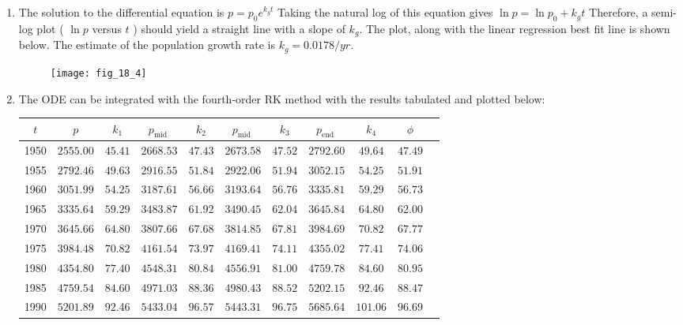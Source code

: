 \documentclass[../main.tex]{subfiles}
\begin{document}
\section{}
\begin{enumerate}[label=\bfseries(\alph*)]
\item The solution to the differential equation is
	\bigbreak
$p=p_{0} e^{k_{g} t}$
	\bigbreak
Taking the natural log of this equation gives
	\bigbreak
$\ln p=\ln p_{0}+k_{g} t$
	\bigbreak
Therefore, a semi-log plot ( $\ln p$ versus $t$ ) should yield a straight line with a slope of $k_{g}$. The plot, along with the linear regression best fit line is shown below. The estimate of the population growth rate is $k_{g}=0.0178 / y r$.
	\bigbreak
	\begin{figure}[H]
		\texttt{[image: fig\_18\_4]}
		\label{fig:fig_18_4}
	\end{figure}
	\bigbreak
\item The ODE can be integrated with the fourth-order RK method with the results tabulated and plotted below:
	\bigbreak
\begin{tabular}{ccccccccccc}
\hline
$t$ & $p$ & $k_{1}$ & $p_{\text {mid }}$ & $k_{2}$ & $p_{\text {mid }}$ & $k_{3}$ & $p_{\text {end }}$ & $k_{4}$ & $\phi$ \\
\hline
1950 & $2555.00$ & $45.41$ & $2668.53$ & $47.43$ & $2673.58$ & $47.52$ & $2792.60$ & $49.64$ & $47.49$ \\
1955 & $2792.46$ & $49.63$ & $2916.55$ & $51.84$ & $2922.06$ & $51.94$ & $3052.15$ & $54.25$ & $51.91$ \\
1960 & $3051.99$ & $54.25$ & $3187.61$ & $56.66$ & $3193.64$ & $56.76$ & $3335.81$ & $59.29$ & $56.73$ \\
1965 & $3335.64$ & $59.29$ & $3483.87$ & $61.92$ & $3490.45$ & $62.04$ & $3645.84$ & $64.80$ & $62.00$ \\
1970 & $3645.66$ & $64.80$ & $3807.66$ & $67.68$ & $3814.85$ & $67.81$ & $3984.69$ & $70.82$ & $67.77$ \\
1975 & $3984.48$ & $70.82$ & $4161.54$ & $73.97$ & $4169.41$ & $74.11$ & $4355.02$ & $77.41$ & $74.06$ \\
1980 & $4354.80$ & $77.40$ & $4548.31$ & $80.84$ & $4556.91$ & $81.00$ & $4759.78$ & $84.60$ & $80.95$ \\
1985 & $4759.54$ & $84.60$ & $4971.03$ & $88.36$ & $4980.43$ & $88.52$ & $5202.15$ & $92.46$ & $88.47$ \\
1990 & $5201.89$ & $92.46$ & $5433.04$ & $96.57$ & $5443.31$ & $96.75$ & $5685.64$ & $101.06$ & $96.69$ \\

\end{tabular}
\end{enumerate}
\end{document}
